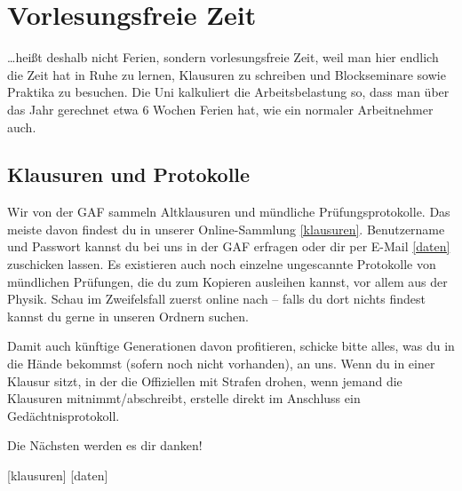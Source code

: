 \chapter{Vorlesungsfreie Zeit}

\ldots heißt deshalb nicht Ferien, sondern vorlesungsfreie Zeit, weil man hier
endlich die Zeit hat in Ruhe zu lernen, Klausuren zu schreiben und
Blockseminare sowie Praktika zu besuchen. Die Uni kalkuliert die
Arbeitsbelastung so, dass man über das Jahr gerechnet etwa 6 Wochen Ferien hat, wie
ein normaler Arbeitnehmer auch.

\section{Klausuren und Protokolle}
Wir von der GAF sammeln Altklausuren und mündliche Prüfungsprotokolle. Das
meiste davon findest du in unserer Online-Sammlung \ref{klausuren}.
Benutzername und Passwort kannst du bei uns in der GAF erfragen oder dir per
E-Mail \ref{daten} zuschicken lassen.  Es existieren auch noch einzelne
ungescannte Protokolle von mündlichen Prüfungen, die du zum Kopieren ausleihen
kannst, vor allem aus der Physik. Schau im Zweifelsfall zuerst online nach --
falls du dort nichts findest kannst du gerne in unseren Ordnern suchen.

Damit auch künftige Generationen davon profitieren, schicke bitte alles,
was du in die Hände bekommst (sofern noch nicht vorhanden), an uns.
Wenn du in einer Klausur sitzt, in der die Offiziellen mit Strafen
drohen, wenn jemand die Klausuren mitnimmt/abschreibt, erstelle
direkt im Anschluss ein Gedächtnisprotokoll.

Die Nächsten werden es dir danken!

\begin{urlList}
	[klausuren]
	[daten]
\end{urlList}

